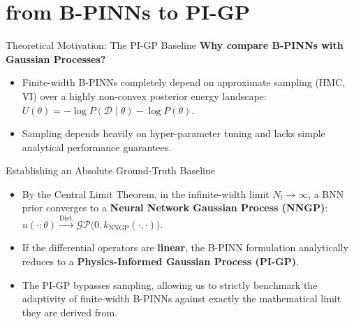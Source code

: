 \documentclass[10pt, aspectratio=169]{beamer}
\begin{document}
  
\section{from B-PINNs to PI-GP}

\begin{frame}{Theoretical Motivation: The PI-GP Baseline}
    \textbf{Why compare B-PINNs with Gaussian Processes?}
    \begin{itemize}
        \item Finite-width B-PINNs completely depend on approximate sampling (HMC, VI) over a highly non-convex posterior energy landscape: $U(\theta) = -\log P(\mathcal{D}\mid\theta) - \log P(\theta)$.
        \item Sampling depends heavily on hyper-parameter tuning and lacks simple analytical performance guarantees.
    \end{itemize}
    \vspace{0.1cm}
    \begin{block}{Establishing an Absolute Ground-Truth Baseline}
        \begin{itemize}
            \item By the Central Limit Theorem, in the infinite-width limit $N_l \to \infty$, a BNN prior converges to a \textbf{Neural Network Gaussian Process (NNGP)}: $u(\cdot;\theta) \xrightarrow{\text{Dist.}} \mathcal{GP}\big(0, k_{\text{NNGP}}(\cdot, \cdot)\big)$.
            \item If the differential operators are \textbf{linear}, the B-PINN formulation analytically reduces to a \textbf{Physics-Informed Gaussian Process (PI-GP)}.
            \item The PI-GP bypasses sampling, allowing us to strictly benchmark the adaptivity of finite-width B-PINNs against exactly the mathematical limit they are derived from.
        \end{itemize}
    \end{block}
\end{frame}
\end{document}
